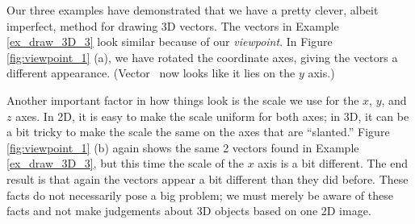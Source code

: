 \medskip

Our three examples have demonstrated that we have a pretty clever, albeit imperfect, method for drawing 3D vectors. The vectors in Example \ref{ex_draw_3D_3} look similar because of our \textit{viewpoint}. In Figure \ref{fig:viewpoint_1} (a), we have rotated the coordinate axes, giving the vectors a different appearance. (Vector \vv\ now looks like it lies on the $y$ axis.) 

Another important factor in how things look is the scale we use for the $x$, $y$, and $z$ axes. In 2D, it is easy to make the scale uniform for both axes; in 3D, it can be a bit tricky to make the scale the same on the axes that are ``slanted.'' Figure \ref{fig:viewpoint_1} (b) again shows the same 2 vectors found in Example \ref{ex_draw_3D_3}, but this time the scale of the $x$ axis is a bit different. The end result is that again the vectors appear a bit different than they did before.
These facts do not necessarily pose a big problem; we must merely be aware of these facts and not make judgements about 3D objects based on one 2D image.


